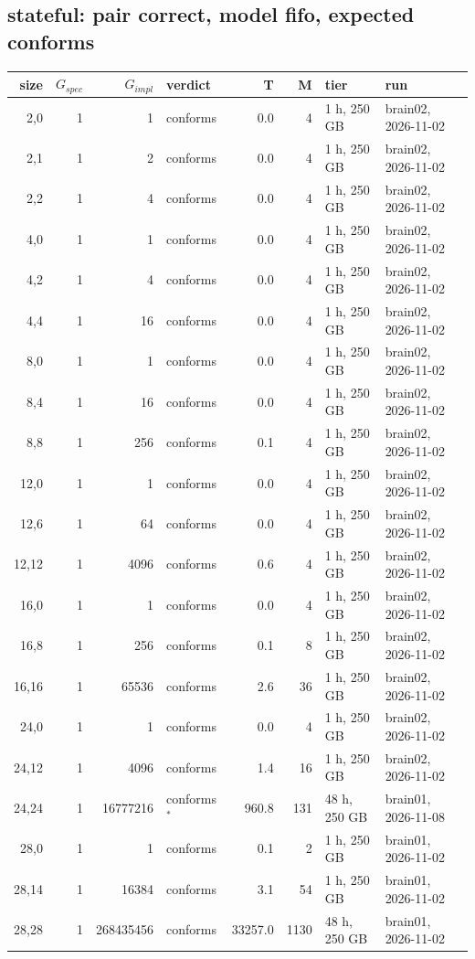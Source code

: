 \documentclass[10pt]{article}
\begin{document}
\subsection*{stateful: pair \textsf{correct}, model fifo, expected conforms}
\begin{longtable}{@{}rrrlrrll@{}}
\toprule
size & $G_{\mathit{spec}}$ & $G_{\mathit{impl}}$ & verdict & T & M & tier & run \\
\midrule
\endhead
\color{blue} 2,0 & 1 & 1 & conforms & 0.0 & 4 & 1 h, 250 GB & brain02, 2026-11-02 \\
\color{blue} 2,1 & 1 & 2 & conforms & 0.0 & 4 & 1 h, 250 GB & brain02, 2026-11-02 \\
\color{blue} 2,2 & 1 & 4 & conforms & 0.0 & 4 & 1 h, 250 GB & brain02, 2026-11-02 \\
\color{blue} 4,0 & 1 & 1 & conforms & 0.0 & 4 & 1 h, 250 GB & brain02, 2026-11-02 \\
\color{blue} 4,2 & 1 & 4 & conforms & 0.0 & 4 & 1 h, 250 GB & brain02, 2026-11-02 \\
\color{blue} 4,4 & 1 & 16 & conforms & 0.0 & 4 & 1 h, 250 GB & brain02, 2026-11-02 \\
\color{blue} 8,0 & 1 & 1 & conforms & 0.0 & 4 & 1 h, 250 GB & brain02, 2026-11-02 \\
\color{blue} 8,4 & 1 & 16 & conforms & 0.0 & 4 & 1 h, 250 GB & brain02, 2026-11-02 \\
\color{blue} 8,8 & 1 & 256 & conforms & 0.1 & 4 & 1 h, 250 GB & brain02, 2026-11-02 \\
\color{blue} 12,0 & 1 & 1 & conforms & 0.0 & 4 & 1 h, 250 GB & brain02, 2026-11-02 \\
\color{blue} 12,6 & 1 & 64 & conforms & 0.0 & 4 & 1 h, 250 GB & brain02, 2026-11-02 \\
\color{blue} 12,12 & 1 & 4096 & conforms & 0.6 & 4 & 1 h, 250 GB & brain02, 2026-11-02 \\
\color{blue} 16,0 & 1 & 1 & conforms & 0.0 & 4 & 1 h, 250 GB & brain02, 2026-11-02 \\
\color{blue} 16,8 & 1 & 256 & conforms & 0.1 & 8 & 1 h, 250 GB & brain02, 2026-11-02 \\
\color{blue} 16,16 & 1 & 65536 & conforms & 2.6 & 36 & 1 h, 250 GB & brain02, 2026-11-02 \\
\color{blue} 24,0 & 1 & 1 & conforms & 0.0 & 4 & 1 h, 250 GB & brain02, 2026-11-02 \\
\color{blue} 24,12 & 1 & 4096 & conforms & 1.4 & 16 & 1 h, 250 GB & brain02, 2026-11-02 \\
\color{blue} 24,24 & 1 & 16777216 & conforms$^{\ast}$ & 960.8 & 131 & 48 h, 250 GB & brain01, 2026-11-08 \\
\color{blue} 28,0 & 1 & 1 & conforms & 0.1 & 2 & 1 h, 250 GB & brain01, 2026-11-02 \\
\color{blue} 28,14 & 1 & 16384 & conforms & 3.1 & 54 & 1 h, 250 GB & brain01, 2026-11-02 \\
\color{blue} 28,28 & 1 & 268435456 & conforms & 33257.0 & 1130 & 48 h, 250 GB & brain01, 2026-11-02 \\
\bottomrule
\end{longtable}
\end{document}

